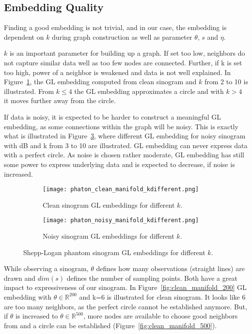 \subsection{Embedding Quality}
\label{sec:embedding_quality}

Finding a good embedding is not trivial, and in our case, the embedding is dependent on $k$ during graph construction
as well as parameter $\theta$, $s$ and $\eta$.

$k$ is an important parameter for building up a graph. If set too low, neighbors
do not capture similar data well as too few nodes are connected. 
Further, if k is set too high, power of a neighbor 
is weakened and data is not well explained.
In Figure~\ref{fig:clean_manifolds}, the GL embedding computed from clean sinogram and $k$ from 2 to 10 is illustrated.
From $k \leq 4$ the GL embedding approximates a circle and with $k >  4$ it moves further away from the circle. 

If data is noisy, it is expected to be harder to construct a meaningful GL embedding, as some connections within
the graph will be noisy. This is exactly what is illustrated in Figure~\ref{fig:noisy_manifolds}, where 
different GL embedding for noisy sinogram with  dB and k from 3 to 10 are illustrated.
GL embedding can never express data with a perfect circle. As noise is chosen rather moderate, GL embedding has still some 
power to express underlying data and is expected to decrease, if noise is increased.


\begin{figure}[H]
    \captionsetup[subfigure]{justification=centering}
    \centering
    \begin{subfigure}[t]{0.45\textwidth}
        \texttt{[image: phaton\_clean\_manifold\_kdifferent.png]}
        \caption{Clean sinogram GL embeddings for different $k$.}
        \label{fig:clean_manifolds}
    \end{subfigure}\hfill
    \begin{subfigure}[t]{0.45\textwidth}
      \texttt{[image: phaton\_noisy\_manifold\_kdifferent.png]}
      \caption{Noisy sinogram GL embeddings for different $k$.}
      \label{fig:noisy_manifolds}
    \end{subfigure}\hfill
    \caption{Shepp-Logan phantom sinogram GL embeddings for different $k$.}
  \end{figure}


While observing a sinogram, $\theta$ defines how many observations (straight lines) are drawn
and $dim(s)$ defines the number of sampling points. Both have a great impact to expressiveness of our sinogram.
In Figure~\ref{fig:clean_manifold_200} GL embedding with $\theta \in \mathbb{R}^{200}$ and k=6 is illustrated
for clean sinogram. It looks like 6 are too many neighbors, as the perfect circle cannot be established anymore.
But, if $\theta$ is increased to $\theta \in \mathbb{R}^{500}$, more nodes are available to choose good neighbors from
and a circle can be established (Figure~\ref{fig:clean_manifold_500}).

